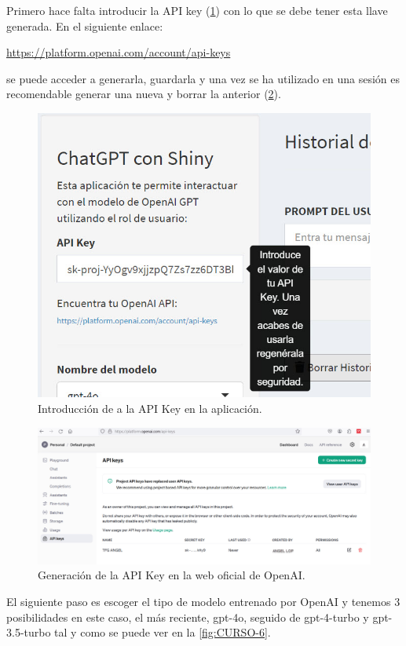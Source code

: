\documentclass[
]{book}
\begin{document}
Primero hace falta introducir la API key (\ref{fig:CURSO-4}) con lo que se debe tener esta llave generada. En el siguiente enlace:

\url{https://platform.openai.com/account/api-keys}

se puede acceder a generarla, guardarla y una vez se ha utilizado en una sesión es recomendable generar una nueva y borrar la anterior (\ref{fig:CURSO-5}).

\begin{figure}

{\centering \includegraphics[width=0.6\linewidth]{FIG5} 

}

\caption{Introducción de a la API Key en la aplicación.}\label{fig:CURSO-4}
\end{figure}

\begin{figure}

{\centering \includegraphics[width=1\linewidth]{FIG6} 

}

\caption{Generación de la API Key en la web oficial de OpenAI. }\label{fig:CURSO-5}
\end{figure}

El siguiente paso es escoger el tipo de modelo entrenado por OpenAI y tenemos 3 posibilidades en este caso, el más reciente, gpt-4o, seguido de gpt-4-turbo y gpt-3.5-turbo tal y como se puede ver en la \ref{fig:CURSO-6}.
\end{document}
